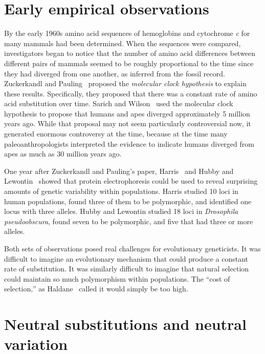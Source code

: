\documentclass[12pt]{article}
\begin{document}
\section*{Early empirical observations}

By the early 1960s amino acid sequences of hemoglobins and cytochrome
{\it c\/} for many mammals had been determined. When the sequences
were compared, investigators began to notice that the number of amino
acid differences between different pairs of mammals seemed to be
roughly proportional to the time since they had diverged from one
another, as inferred from the fossil record. Zuckerkandl and
Pauling~\cite{Zuckerkandl-Pauling65} proposed the {\it molecular clock
hypothesis\/} to explain these results. Specifically, they proposed
that there was a constant rate of amino acid substitution over
time. Sarich and Wilson~\cite{Sarich-Wilson67,Wilson-Sarich69} used
the molecular clock hypothesis to propose that humans and apes
diverged approximately 5 million years ago. While that proposal may
not seem particularly controversial now, it generated enormous
controversy at the time, because at the time many paleoanthropologists
interpreted the evidence to indicate humans diverged from apes as much
as 30 million years ago.

One year after Zuckerkandl and Pauling's paper, Harris~\cite{Harris66}
and Hubby and Lewontin~\cite{Hubby-Lewontin66,Lewontin-Hubby66} showed
that protein electrophoresis could be used to reveal surprising
amounts of genetic variability within populations. Harris studied
10 loci in human populations, found three of them to be polymorphic,
and identified one locus with three alleles. Hubby and Lewontin
studied 18 loci in {\it Drosophila pseudoobscura\/}, found seven to be
polymorphic, and five that had three or more alleles.

Both sets of observations posed real challenges for evolutionary
geneticists. It was difficult to imagine an evolutionary mechanism
that could produce a constant rate of substitution. It was similarly
difficult to imagine that natural selection could maintain so much
polymorphism within populations. The ``cost of selection,'' as
Haldane~\cite{Haldane-1957} called it would simply be too
high.

\section*{Neutral substitutions and neutral variation}
\end{document}
